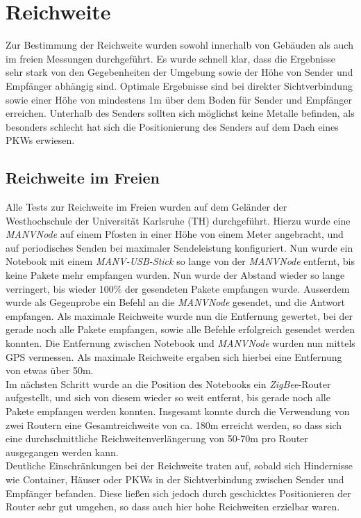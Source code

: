 \section{Reichweite}
Zur Bestimmung der Reichweite wurden sowohl innerhalb von Gebäuden als auch im freien Messungen durchgeführt. 
Es wurde schnell klar, dass die Ergebnisse sehr stark von den Gegebenheiten der Umgebung sowie der Höhe von
Sender und Empfänger abhängig sind. Optimale Ergebnisse sind bei direkter Sichtverbindung
sowie einer Höhe von mindestens 1m über dem Boden für Sender und Empfänger erreichen. 
Unterhalb des Senders sollten sich möglichst keine Metalle befinden, als besonders schlecht hat sich die 
Positionierung des Senders auf dem Dach eines PKWs erwiesen. 

\subsection{Reichweite im Freien}
Alle Tests zur Reichweite im Freien wurden auf dem Geländer der Westhochschule der Universität Karlsruhe (TH)
durchgeführt. Hierzu wurde eine \emph{MANVNode} auf einem Pfosten in einer Höhe von einem Meter angebracht,
und auf periodisches Senden bei maximaler Sendeleistung konfiguriert.  Nun wurde ein Notebook mit einem 
\emph{MANV-USB-Stick} so lange von der \emph{MANVNode} entfernt, bis keine Pakete mehr empfangen wurden.
Nun wurde der Abstand wieder so lange verringert, bis wieder 100\% der gesendeten Pakete empfangen wurde.
Ausserdem wurde als Gegenprobe ein Befehl an die \emph{MANVNode} gesendet, und die Antwort empfangen. 
Als maximale Reichweite wurde nun die Entfernung gewertet, bei der gerade noch alle Pakete empfangen, 
sowie alle Befehle erfolgreich gesendet werden konnten. Die Entfernung zwischen Notebook und 
\emph{MANVNode} wurden nun mittels GPS vermessen. Als maximale Reichweite ergaben sich hierbei eine Entfernung
von etwas über 50m.\\
Im nächsten Schritt wurde an die Position des Notebooks ein \emph{ZigBee}-Router aufgestellt, und sich von
diesem wieder so weit entfernt, bis gerade noch alle Pakete empfangen werden konnten. Insgesamt konnte durch
die Verwendung von zwei Routern eine Gesamtreichweite von ca. 180m erreicht werden, so dass sich eine 
durchschnittliche Reichweitenverlängerung von 50-70m pro Router ausgegangen werden kann.\\
Deutliche Einschränkungen bei der Reichweite traten auf, sobald sich Hindernisse wie Container, Häuser oder 
PKWs in der Sichtverbindung zwischen Sender und Empfänger befanden. Diese ließen sich jedoch durch geschicktes
Positionieren der Router sehr gut umgehen, so dass auch hier hohe Reichweiten erzielbar waren. 


